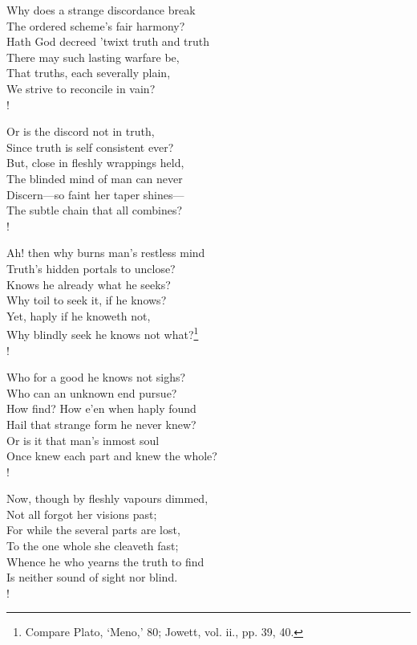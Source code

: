 \documentclass[12pt]{book}
\newenvironment{vpoem}[1]%
  {\def\poemvsindentlines{#1}\begin{poem}\small}%
  {\end{poem}\def\poemvsindentlines{\relax}}
\begin{document}
\begin{vpoem}{24}
    Why does a strange discordance break \\
      The ordered scheme's fair harmony? \\
    Hath God decreed 'twixt truth and truth \\
      There may such lasting warfare be, \\
    That truths, each severally plain, \\
    We strive to reconcile in vain? \\!

    Or is the discord not in truth, \\
      Since truth is self consistent ever? \\
    But, close in fleshly wrappings held, \\
      The blinded mind of man can never \\
    Discern---so faint her taper shines--- \\
    The subtle chain that all combines? \\!

    Ah! then why burns man's restless mind \\
      Truth's hidden portals to unclose? \\
    Knows he already what he seeks? \\
      Why toil to seek it, if he knows? \\
    Yet, haply if he knoweth not, \\
    Why blindly seek he knows not what?\footnote{Compare Plato, `Meno,' 80; Jowett, vol. ii., pp. 39, 40.} \\!

    Who for a good he knows not sighs? \\
      Who can an unknown end pursue? \\
    How find? How e'en when haply found \\
      Hail that strange form he never knew? \\
    Or is it that man's inmost soul \\
    Once knew each part and knew the whole? \\!

    Now, though by fleshly vapours dimmed, \\
      Not all forgot her visions past; \\
    For while the several parts are lost, \\
      To the one whole she cleaveth fast; \\
    Whence he who yearns the truth to find \\
    Is neither sound of sight nor blind. \\!


\end{vpoem}
\end{document}
